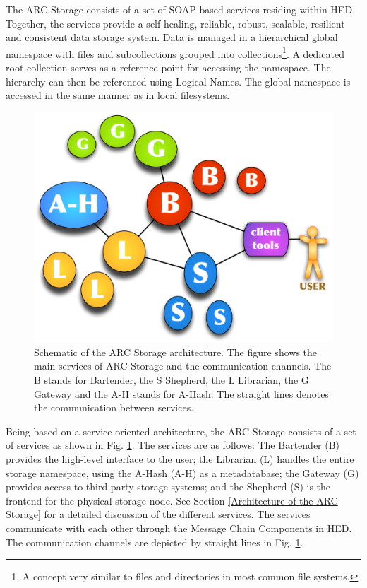 \documentclass[final]{ieee}
\begin{document}
The ARC Storage consists of a set of SOAP based services residing
within HED. Together, the services provide a self-healing, reliable, robust,
scalable, resilient and consistent data storage system. Data is
managed in a hierarchical global namespace with files and
subcollections grouped into collections\footnote{A concept very
  similar to files and directories in most common file systems.}.  A
dedicated root collection serves as a reference point for accessing the namespace. The hierarchy can then be
referenced using Logical Names. The global namespace is accessed
in the same manner as in local filesystems.

\begin{figure}
  \begin{center}
    \includegraphics[width=0.8\columnwidth]{arc1-storage-services-with-gateway.pdf}
  \end{center}
  \caption{Schematic of the ARC Storage architecture. The figure shows
    the main services of ARC Storage and the communication channels. The B stands for Bartender, the S Shepherd, the L Librarian, the G Gateway and the A-H stands for A-Hash. The straight lines denotes the communication between services.}
  \label{fig:arc1_storage_service}
\end{figure}

Being based on a service oriented architecture, the ARC
Storage consists of a set of services as shown in Fig.
\ref{fig:arc1_storage_service}. The services are as follows: The Bartender (B)
provides the high-level interface to the user; the Librarian (L)
handles the entire storage namespace, using the A-Hash (A-H) as a metadatabase; the
Gateway (G) provides access to third-party storage systems; and
the Shepherd (S) is the frontend for the physical storage node. 
See Section \ref{Architecture of the ARC Storage} for a detailed
discussion of the different services.   
The services communicate with each other through the
Message Chain Components in HED. The communication channels are
depicted by straight lines in Fig. \ref{fig:arc1_storage_service}.
\end{document}
